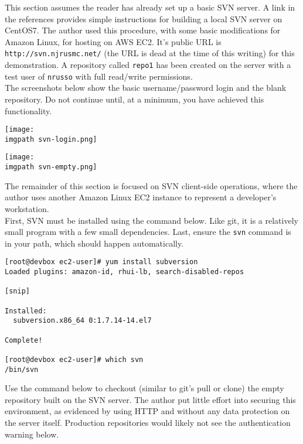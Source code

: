 This section assumes the reader has already set up a basic SVN server. A link
in the references provides simple instructions for building a local SVN server
on CentOS7. The author used this procedure, with some basic modifications for
Amazon Linux, for hosting on AWS EC2. It's public URL is
\verb|http://svn.njrusmc.net/| (the URL is dead at the time of this writing)
for this demonstration. A repository called \verb|repo1| has been created on
the server with a test user of \verb|nrusso| with full read/write permissions. \\

The screenshots below show the basic username/password login and the blank
repository. Do not continue until, at a minimum, you have achieved this
functionality.

    \begin{minipage}[t]{\linewidth}
	  \centering
      \texttt{[image: \\imgpath svn-login.png]}
    \end{minipage}

    \begin{minipage}[t]{\linewidth}
	  \centering
      \texttt{[image: \\imgpath svn-empty.png]}
    \end{minipage}

The remainder of this section is focused on SVN client-side operations, where
the author uses another Amazon Linux EC2 instance to represent a developer's
workstation. \\

First, SVN must be installed using the command below. Like git, it is a
relatively small program with a few small dependencies. Last, ensure the
\verb|svn| command is in your path, which should happen automatically.

\begin{verbatim}
[root@devbox ec2-user]# yum install subversion
Loaded plugins: amazon-id, rhui-lb, search-disabled-repos

[snip]

Installed:
  subversion.x86_64 0:1.7.14-14.el7

Complete!

[root@devbox ec2-user]# which svn
/bin/svn
\end{verbatim}

Use the command below to checkout (similar to git's pull or clone) the empty
repository built on the SVN server. The author put little effort into securing
this environment, as evidenced by using HTTP and without any data protection
on the server itself. Production repositories would likely not see the
authentication warning below.

